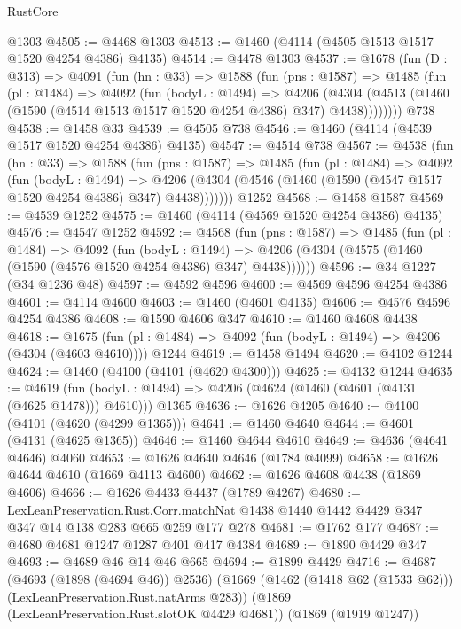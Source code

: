 \begin{lexlean}{RustCore}
\begin{coremodule}
    @1303
@4505 := @4468 @1303
@4513 := @1460 (@4114 (@4505 @1513 @1517 @1520 @4254 @4386) @4135)
@4514 := @4478 @1303
@4537 := @1678
    (fun (D : @313) =>
    @4091
      (fun (hn : @33) =>
      @1588
        (fun (pns : @1587) =>
        @1485
          (fun (pl : @1484) =>
          @4092
            (fun (bodyL : @1494) =>
            @4206
              (@4304 (@4513 (@1460 (@1590 (@4514 @1513 @1517 @1520 @4254 @4386) @347) @4438))))))))
    @738
@4538 := @1458 @33
@4539 := @4505 @738
@4546 := @1460 (@4114 (@4539 @1517 @1520 @4254 @4386) @4135)
@4547 := @4514 @738
@4567 := @4538
    (fun (hn : @33) =>
    @1588
      (fun (pns : @1587) =>
      @1485
        (fun (pl : @1484) =>
        @4092
          (fun (bodyL : @1494) =>
          @4206 (@4304 (@4546 (@1460 (@1590 (@4547 @1517 @1520 @4254 @4386) @347) @4438)))))))
    @1252
@4568 := @1458 @1587
@4569 := @4539 @1252
@4575 := @1460 (@4114 (@4569 @1520 @4254 @4386) @4135)
@4576 := @4547 @1252
@4592 := @4568
    (fun (pns : @1587) =>
    @1485
      (fun (pl : @1484) =>
      @4092
        (fun (bodyL : @1494) =>
        @4206 (@4304 (@4575 (@1460 (@1590 (@4576 @1520 @4254 @4386) @347) @4438))))))
@4596 := @34 @1227 (@34 @1236 @48)
@4597 := @4592 @4596
@4600 := @4569 @4596 @4254 @4386
@4601 := @4114 @4600
@4603 := @1460 (@4601 @4135)
@4606 := @4576 @4596 @4254 @4386
@4608 := @1590 @4606 @347
@4610 := @1460 @4608 @4438
@4618 := @1675
    (fun (pl : @1484) => @4092 (fun (bodyL : @1494) => @4206 (@4304 (@4603 @4610))))
    @1244
@4619 := @1458 @1494
@4620 := @4102 @1244
@4624 := @1460 (@4100 (@4101 (@4620 @4300)))
@4625 := @4132 @1244
@4635 := @4619
    (fun (bodyL : @1494) => @4206 (@4624 (@1460 (@4601 (@4131 (@4625 @1478))) @4610)))
    @1365
@4636 := @1626 @4205
@4640 := @4100 (@4101 (@4620 (@4299 @1365)))
@4641 := @1460 @4640
@4644 := @4601 (@4131 (@4625 @1365))
@4646 := @1460 @4644 @4610
@4649 := @4636 (@4641 @4646) @4060
@4653 := @1626 @4640 @4646 (@1784 @4099)
@4658 := @1626 @4644 @4610 (@1669 @4113 @4600)
@4662 := @1626 @4608 @4438 (@1869 @4606)
@4666 := @1626 @4433 @4437 (@1789 @4267)
@4680 := LexLeanPreservation.Rust.Corr.matchNat
    @1438
    @1440
    @1442
    @4429
    @347
    @347
    @14
    @138
    @283
    @665
    @259
    @177
    @278
@4681 := @1762 @177
@4687 := @4680 @4681 @1247 @1287 @401 @417 @4384
@4689 := @1890 @4429 @347
@4693 := @4689 @46 @14 @46 @665
@4694 := @1899 @4429
@4716 := @4687
    (@4693 (@1898 (@4694 @46)) @2536)
    (@1669 (@1462 (@1418 @62 (@1533 @62))) (LexLeanPreservation.Rust.natArms @283))
    (@1869 (LexLeanPreservation.Rust.slotOK @4429 @4681))
    (@1869 (@1919 @1247))

\end{coremodule}
\end{lexlean}
